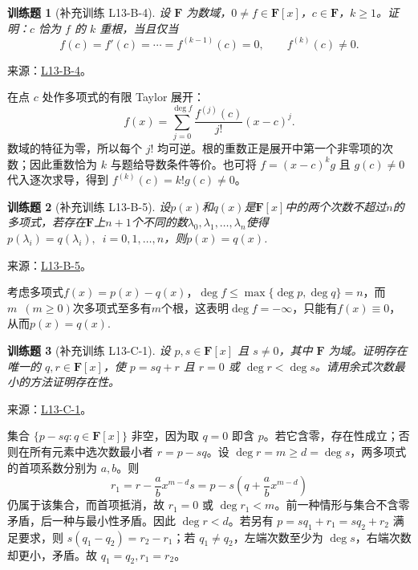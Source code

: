 \documentclass[12pt,fontset=fandol]{ctexart}
\newtheorem{exercise}{训练题}[section]
\begin{document}
\begin{exercise}[补充训练 L13-B-4]\label{prob:L13-B-4}
设 $\mathbf F$ 为数域，$0\ne f\in\mathbf F[x]$，$c\in\mathbf F$，$k\ge1$。证明：$c$ 恰为 $f$ 的 $k$ 重根，当且仅当
\[f(c)=f'(c)=\cdots=f^{(k-1)}(c)=0,\qquad f^{(k)}(c)\ne0.\]
\end{exercise}
\noindent 来源：\href{https://github.com/yhwu-is/Linear-Algebra-Left-Undone/blob/new/%E8%AE%B2%E4%B9%89/%E4%B8%93%E9%A2%98/13%20%E5%A4%9A%E9%A1%B9%E5%BC%8F.tex}{L13-B-4}。
\begin{solve}
在点 $c$ 处作多项式的有限 Taylor 展开：
\[f(x)=\sum_{j=0}^{\deg f}\frac{f^{(j)}(c)}{j!}(x-c)^j.\]
数域的特征为零，所以每个 $j!$ 均可逆。根的重数正是展开中第一个非零项的次数；因此重数恰为 $k$ 与题给导数条件等价。也可将 $f=(x-c)^kg$ 且 $g(c)\ne0$ 代入逐次求导，得到 $f^{(k)}(c)=k!g(c)\ne0$。
\end{solve}

\begin{exercise}[补充训练 L13-B-5]\label{prob:L13-B-5}
设$p(x)$和$q(x)$是$\mathbf{F}[x]$中的两个次数不超过$n$的多项式，若存在$\mathbf{F}$上$n+1$个不同的数$\lambda_0,\lambda_1,\ldots,\lambda_n$使得$p(\lambda_i)=q(\lambda_i),\enspace i=0,1,\ldots,n$，则$p(x)=q(x)$.
\end{exercise}
\noindent 来源：\href{https://github.com/yhwu-is/Linear-Algebra-Left-Undone/blob/new/%E8%AE%B2%E4%B9%89/%E4%B8%93%E9%A2%98/13%20%E5%A4%9A%E9%A1%B9%E5%BC%8F.tex}{L13-B-5}。
\begin{solve}
考虑多项式$f(x)=p(x)-q(x)$，$\deg f\leqslant \max\{\deg p,\deg q\}=n$，而$m\enspace(m\geqslant 0)$次多项式至多有$m$个根，这表明$\deg f=-\infty$，只能有$f(x)\equiv 0$，从而$p(x)=q(x)$.
\end{solve}

\begin{exercise}[补充训练 L13-C-1]\label{prob:L13-C-1}
设 $p,s\in\mathbf F[x]$ 且 $s\ne0$，其中 $\mathbf F$ 为域。证明存在唯一的 $q,r\in\mathbf F[x]$，使 $p=sq+r$ 且 $r=0$ 或 $\deg r<\deg s$。请用余式次数最小的方法证明存在性。
\end{exercise}
\noindent 来源：\href{https://github.com/yhwu-is/Linear-Algebra-Left-Undone/blob/new/%E8%AE%B2%E4%B9%89/%E4%B8%93%E9%A2%98/13%20%E5%A4%9A%E9%A1%B9%E5%BC%8F.tex}{L13-C-1}。
\begin{solve}
集合 $\{p-sq:q\in\mathbf F[x]\}$ 非空，因为取 $q=0$ 即含 $p$。若它含零，存在性成立；否则在所有元素中选次数最小者 $r=p-sq$。设 $\deg r=m\ge d=\deg s$，两多项式的首项系数分别为 $a,b$。则
\[r_1=r-\frac abx^{m-d}s=p-s\left(q+\frac abx^{m-d}\right)\]
仍属于该集合，而首项抵消，故 $r_1=0$ 或 $\deg r_1<m$。前一种情形与集合不含零矛盾，后一种与最小性矛盾。因此 $\deg r<d$。若另有 $p=sq_1+r_1=sq_2+r_2$ 满足要求，则 $s(q_1-q_2)=r_2-r_1$；若 $q_1\ne q_2$，左端次数至少为 $\deg s$，右端次数却更小，矛盾。故 $q_1=q_2,r_1=r_2$。
\end{solve}
\end{document}
